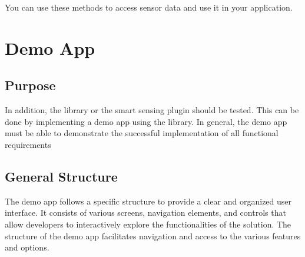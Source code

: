 \documentclass[12pt]{article}
\begin{document}
    You can use these methods to access sensor data and use it in your application.


\section{Demo App}

\subsection{Purpose}
    In addition, the library or the smart sensing plugin should be tested. This can be done by implementing a demo app using the library. In general, the demo app must be able to demonstrate the successful implementation of all functional requirements

\subsection{General Structure}
    The demo app follows a specific structure to provide a clear and organized user interface. It consists of various screens, navigation elements, and controls that allow developers to interactively explore the functionalities of the solution. The structure of the demo app facilitates navigation and access to the various features and options.
\end{document}
